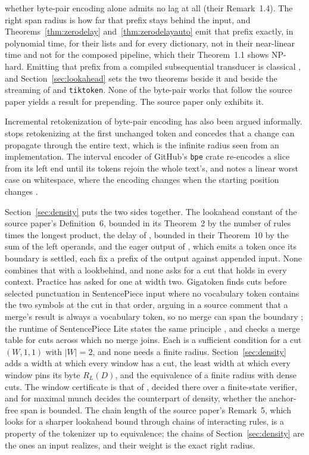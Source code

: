 \documentclass[11pt,a4paper]{article}
\theoremstyle{definition}
\theoremstyle{plain}
\newcommand{\code}[1]{\texttt{#1}}
\newcommand{\ripple}{R_{L}}
\begin{document}
whether byte-pair encoding alone admits no lag at all (their Remark~1.4). The right span radius is how far that prefix
stays behind the input, and Theorems~\ref{thm:zerodelay} and~\ref{thm:zerodelayauto} emit that prefix exactly, in
polynomial time, for their lists and for every dictionary, not in their near-linear time and not for the composed
pipeline, which their Theorem~1.1 shows NP-hard. Emitting that prefix from a compiled subsequential transducer is
classical \citep{mohri1994compact}, and Section~\ref{sec:lookahead} sets the two theorems beside it and beside the
streaming of \citet{hayase2025bytesampler} and \code{tiktoken}. None of the byte-pair works that follow the source paper
yields a result for prepending. The source paper only exhibits it.

Incremental retokenization of byte-pair encoding has also been argued informally.
\citet[Section~4.1]{hellsten2024incremental} stops retokenizing at the first unchanged token and concedes that a change
can propagate through the entire text, which is the infinite radius seen from an implementation. The interval encoder of
GitHub's \code{bpe} crate re-encodes a slice from its left end until its tokens rejoin the whole text's, and notes a
linear worst case on whitespace, where the encoding changes when the starting position changes
\citep{vanantwerpen2024bpe}.

Section~\ref{sec:density} puts the two sides together. The lookahead constant of the source paper's Definition~6,
bounded in its Theorem~2 by the number of rules times the longest product, the delay of \citet{mamouras2026bpe}, bounded
in their Theorem~10 by the sum of the left operands, and the eager output of \citet{jiang2026incremental}, which emits a
token once its boundary is settled, each fix a prefix of the output against appended input. None combines that with a
lookbehind, and none asks for a cut that holds in every context. Practice has asked for one at width two. Gigatoken
finds cuts before selected punctuation in SentencePiece input where no vocabulary token contains the two symbols at the
cut in that order, arguing in a source comment that a merge's result is always a vocabulary token, so no merge can span
the boundary \citep{rod2026gigatoken}; the runtime of SentencePiece Lite states the same principle
\citep{sentencepiecelite2026}, and \citet{xu2026parallel} checks a merge table for cuts across which no merge joins.
Each is a sufficient condition for a cut \((W, 1, 1)\) with \(|W| = 2\), and none needs a finite radius.
Section~\ref{sec:density} adds a width at which every window has a cut, the least width at which every window pins its
byte \(\ripple(D)\), and the equivalence of a finite radius with dense cuts. The window certificate is that of
\citet{nidhogg2026finitelyverifiable}, decided there over a finite-state verifier, and for maximal munch
\citet[Theorem~3]{nidhogg2026splitting} decides the counterpart of density, whether the anchor-free span is bounded. The
chain length of the source paper's Remark~5, which looks for a sharper lookahead bound through chains of interacting
rules, is a property of the tokenizer up to equivalence; the chains of Section~\ref{sec:density} are the ones an input
realizes, and their weight is the exact right radius.
\end{document}
